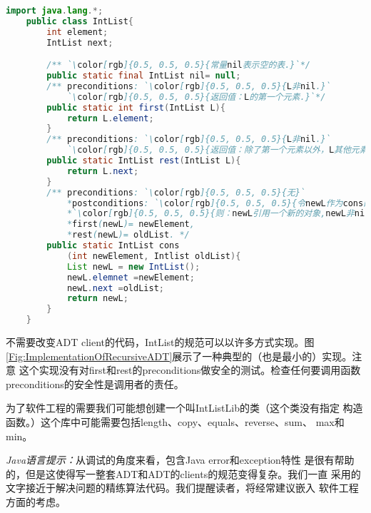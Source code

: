 \begin{figure*}[!t]
\begin{lstlisting}[language={Java},keywordstyle=\color{blue!70}, commentstyle=\color{red!50!green!50!blue!50}]
    import java.lang.*;
    public class IntList{
        int element;
        IntList next;

        /** `\color[rgb]{0.5, 0.5, 0.5}{常量nil表示空的表.}`*/
        public static final IntList nil= null;
        /** preconditions: `\color[rgb]{0.5, 0.5, 0.5}{L非nil.}`
            `\color[rgb]{0.5, 0.5, 0.5}{返回值：L的第一个元素.}`*/
        public static int first(IntList L){
            return L.element;
        }
        /** preconditions: `\color[rgb]{0.5, 0.5, 0.5}{L非nil.}`
            `\color[rgb]{0.5, 0.5, 0.5}{返回值：除了第一个元素以外，L其他元素构成的表.}`*/
        public static IntList rest(IntList L){
            return L.next;
        }
        /** preconditions: `\color[rgb]{0.5, 0.5, 0.5}{无}`
            *postconditions: `\color[rgb]{0.5, 0.5, 0.5}{令newL作为cons的返回值.}`
            *`\color[rgb]{0.5, 0.5, 0.5}{则：newL引用一个新的对象,newL非nil,}`
            *first(newL)= newElement,
            *rest(newL)= oldList. */
        public static IntList cons
            (int newElement, Intlist oldList){
            List newL = new IntList();
            newL.elemnet =newElement;
            newL.next =oldList;
            return newL;
        }
    }
\end{lstlisting}
    \caption{IntList ADT的一个Java类的典型实现。每一个有一个私有实例域
            element和next；公共域nil由于关键字final成为了常量；类剩下的
            部分是方法。Javadoc工具将"/**…*/" 形式的注释和跟在注释后面
            的程序元素关联起来，生成Web浏览器格式的文档。}
    \label{Fig:ImplementationOfRecursiveADT}
\end{figure*}

不需要改变ADT client的代码，IntList的规范可以以许多方式实现。图
\ref{Fig:ImplementationOfRecursiveADT}展示了一种典型的（也是最小的）实现。注意
这个实现没有对first和rest的preconditions做安全的测试。检查任何要调用函数
preconditions的安全性是调用者的责任。

为了软件工程的需要我们可能想创建一个叫IntListLib的类（这个类没有指定
构造函数。）这个库中可能需要包括length、copy、equals、reverse、sum、
max和min。

\textit{Java语言提示：}从调试的角度来看，包含Java error和exception特性
是很有帮助的，但是这使得写一整套ADT和ADT的clients的规范变得复杂。我们一直
采用的文字接近于解决问题的精练算法代码。我们提醒读者，将经常建议嵌入
软件工程方面的考虑。

